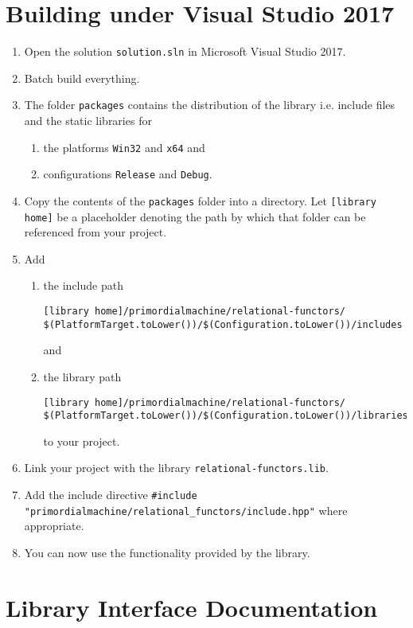 \documentclass[oneside]{book}
\begin{document}
\chapter{Building under Visual Studio 2017}
\begin{enumerate}
\item Open the solution \texttt{solution.sln} in Microsoft Visual Studio 2017.
\item Batch build everything.
\item The folder \texttt{packages} contains the distribution of the library i.e. include files and the
      static libraries for
  \begin{enumerate}
    \item the platforms \texttt{Win32} and \texttt{x64} and
    \item configurations \texttt{Release} and \texttt{Debug}.
  \end{enumerate}
\item Copy the contents of the \verb+packages+ folder into a directory. Let
      \verb+[library home]+ be a placeholder denoting the path by which that folder
      can be referenced from your project.
\item Add
  \begin{enumerate}
    \item the include path
\begin{verbatim}
[library home]/primordialmachine/relational-functors/
$(PlatformTarget.toLower())/$(Configuration.toLower())/includes
\end{verbatim}
	and
    \item the library path
\begin{verbatim}
[library home]/primordialmachine/relational-functors/
$(PlatformTarget.toLower())/$(Configuration.toLower())/libraries
\end{verbatim}
    to your project.
\end{enumerate}
\item Link your project with the library \verb+relational-functors.lib+.
\item Add the include directive \verb+#include "primordialmachine/relational_functors/include.hpp"+ where appropriate.
\item You can now use the functionality provided by the library.
\end{enumerate}

\chapter{Library Interface Documentation}
\end{document}
